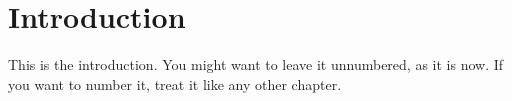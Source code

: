 \chapter*{Introduction}  %

This is the introduction. You might want to leave it unnumbered, as it is now. If you want to number it, treat it like any other chapter.